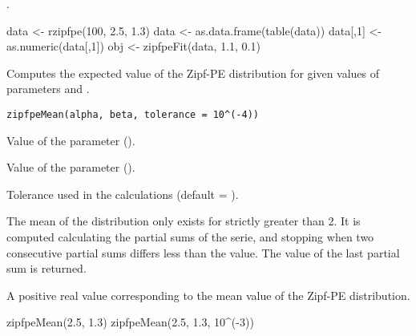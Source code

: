 \documentclass[letterpaper]{book}
\begin{document}
%
\begin{SeeAlso}\relax
{}.
\end{SeeAlso}
%
\begin{Examples}
\begin{ExampleCode}
data <- rzipfpe(100, 2.5, 1.3)
data <- as.data.frame(table(data))
data[,1] <- as.numeric(data[,1])
obj <- zipfpeFit(data, 1.1, 0.1)
\end{ExampleCode}
\end{Examples}
%
\begin{Description}\relax
Computes the expected value of the Zipf-PE distribution for given values of parameters
\eqn{\alpha}{} and \eqn{\beta}{}.
\end{Description}
%
\begin{Usage}
\begin{verbatim}
zipfpeMean(alpha, beta, tolerance = 10^(-4))
\end{verbatim}
\end{Usage}
%
\begin{Arguments}
\begin{ldescription}
\item[\code{alpha}] Value of the \eqn{\alpha}{} parameter ().

\item[\code{beta}] Value of the \eqn{\beta}{} parameter (\eqn{\beta \in (-\infty, +\infty)}{}).

\item[\code{tolerance}] Tolerance used in the calculations (default = ).
\end{ldescription}
\end{Arguments}
%
\begin{Details}\relax
The mean of the distribution only exists for \eqn{\alpha}{} strictly greater than 2.
It is computed calculating the partial sums of the serie, and stopping when two
consecutive partial sums differs less than the  value.
The value of the last partial sum is returned.
\end{Details}
%
\begin{Value}
A positive real value corresponding to the mean value of the Zipf-PE distribution.
\end{Value}
%
\begin{Examples}
\begin{ExampleCode}
zipfpeMean(2.5, 1.3)
zipfpeMean(2.5, 1.3, 10^(-3))
\end{ExampleCode}
\end{Examples}
\end{document}
